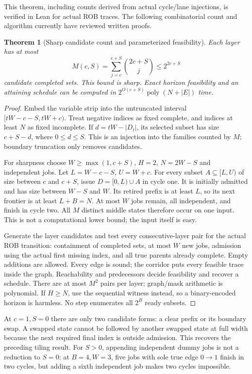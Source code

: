 \documentclass[11pt]{article}
\newtheorem{theorem}{Theorem}
\begin{document}
This theorem, including counts derived from actual cycle/lane injections,
is verified in Lean for actual ROB traces. The following combinatorial
count and algorithm currently have reviewed written proofs.

\begin{theorem}[Sharp candidate count and parameterized feasibility]
Each layer has at most
\[
 M(c,S)=\sum_{j=c}^{c+S}\binom{2c+S}{j}\le2^{2c+S}
\]
candidate completed sets. This bound is sharp. Exact horizon feasibility
and an attaining schedule can be computed in
$2^{O(c+S)}\operatorname{poly}(N+|E|)$ time.
\end{theorem}
\begin{proof}
Embed the variable strip into the untruncated interval
$[tW-c-S,tW+c)$. Treat negative indices as fixed complete, and indices
at least $N$ as fixed incomplete. If $d=tW-|D_t|$, its selected subset
has size $c+S-d$, where $0\le d\le S$. This is an injection into the
families counted by $M$; boundary truncation only removes candidates.

For sharpness choose $W\ge\max(1,c+S)$, $H=2$, $N=2W-S$ and independent
jobs. Let $L=W-c-S$, $U=W+c$. For every subset $A\subseteq[L,U)$ of
size between $c$ and $c+S$, issue $D=[0,L)\cup A$ in cycle one.
It is initially admitted and has size between $W-S$ and $W$.
Its retired prefix is at least $L$, so its next frontier is at least
$L+B=N$. At most $W$ jobs remain, all independent, and finish in cycle two.
All $M$ distinct middle states therefore occur on one input. This is not
a computational lower bound; the input itself is easy.

Generate the layer candidates and test every consecutive-layer pair for
the actual ROB transition: containment of completed sets, at most $W$ new
jobs, admission using the actual first missing index, and all true parents
already complete. Empty additions are allowed. Every edge is sound; the
corridor puts every feasible trace inside the graph. Reachability and
predecessors decide feasibility and recover a schedule. There are at most
$M^2$ pairs per layer; graph/mask arithmetic is polynomial. If $H\ge N$,
use the sequential witness instead, so a binary-encoded horizon is harmless.
No step enumerates all $2^B$ ready subsets.
\end{proof}

At $c=1,S=0$ there are only two candidate forms: a clear prefix or its
boundary swap. A swapped state cannot be followed by another swapped state
at full width because the next required final index is outside admission.
This recovers the preceding tiling result. For $S>0$, appending independent
dummy jobs is not a reduction to $S=0$: at $B=4,W=3$, five jobs with sole
true edge $0\to1$ finish in two cycles, but adding a sixth independent job
makes two cycles impossible.
\end{document}
